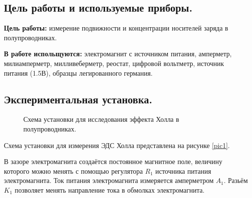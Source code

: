 \documentclass[a4paper,12pt]{article} %
\begin{document}
\subsection{Цель работы и используемые приборы.}

\textbf{Цель работы:} измерение подвижности и концентрации носителей заряда в полупроводниках.

\textbf{В работе испольщуются:} электромагнит с источником питания, амперметр, милиамперметр, милливеберметр, реостат, цифровой вольтметр, источник питания (1.5В), образцы легированного германия.

\subsection{Экспериментальная установка.}

\begin{figure}[H]\label{pic1}
 	\caption{Схема установки для исследования эффекта Холла в полупроводниках.}
\end{figure}

Схема установки для измерения ЭДС Холла представлена на рисунке \eqref{pic1}.

В зазоре электромагнита создаётся постоянное магнитное поле, величину которого можно менять с помощью регулятора $R_1$ источника питания электромагнита. Ток питания электромагнита измеряется амперметром $A_1$. Разьём $K_1$ позволяет менять направление тока в обмолках электромагнита.
\end{document}
